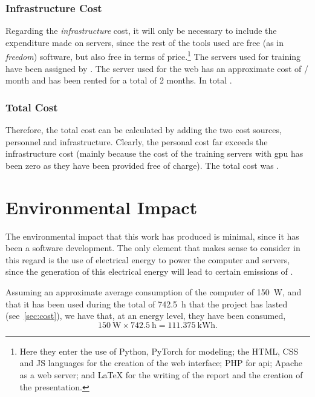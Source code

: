 \subsubsection{Infrastructure Cost}

Regarding the \emph{infrastructure} cost, it will only be necessary to include
the expenditure made on servers, since the rest of the tools used are free (as
in \emph{freedom}) software, but also free in terms of price.\footnote{Here
  they enter the use of Python, PyTorch for modeling; the HTML, CSS and JS
  languages for the creation of the web interface; PHP for \gls{api}; Apache as
  a web server; and \LaTeX{} for the writing of the report and the creation of
  the presentation.} The servers used for training have been assigned by
. The server used for the
web has an approximate cost of  / month and has been rented for a total
of 2 months. In total .

\subsubsection{Total Cost}

Therefore, the total cost can be calculated by adding the two cost sources,
personnel and infrastructure. Clearly, the personal cost far exceeds the
infrastructure cost (mainly because the cost of the training servers with
\gls{gpu} has been zero as they have been provided free of charge). The total
cost was .



\section{Environmental Impact}\label{sec:enviromental}

The environmental impact that this work has produced is minimal, since it has
been a software development. The only element that makes sense to consider in
this regard is the use of electrical energy to power the computer and servers,
since the generation of this electrical energy will lead to certain emissions
of .

Assuming an approximate average consumption of the computer of \SI{150}{\watt},
and that it has been used during the total of \SI{742.5}{\hour} that the
project has lasted (see\ \vref{sec:cost}), we have that, at an energy level,
they have been consumed,
\begin{equation}
  \SI{150}{\watt} \times \SI{742.5}{\hour} = \SI{111.375}{\kWh}.
\end{equation}

